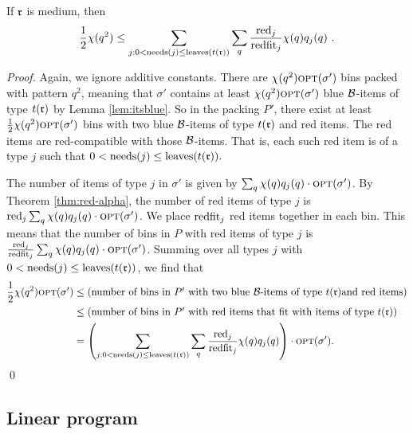 \begin{lemma}
	\label{lem:q2fv}
	If $\mathfrak{r}$ is medium, then
	\[ \frac1{2}\chi(q^2) \le 
	\sum_{j:0<\mathrm{needs}(j)\le \mathrm{leaves}({t(\mathfrak{r})})} \sum_{q} \frac{\mathrm{red}_j}{\mathrm{redfit}_j}\chi(q)q_j(q)\ .\] 
\end{lemma}
\begin{proof}
	Again, we ignore additive constants.
	There are $\chi(q^2)\mbox{\textsc{opt}}(\sigma')$ bins packed with pattern $q^2$, meaning that
 	$\sigma'$ contains at least $\chi(q^2)\mbox{\textsc{opt}}(\sigma')$ blue $\mathcal{B}$-items of type $t(\mathfrak{r})$
	by Lemma \ref{lem:itsblue}. So in the packing $P'$, there exist
	at least $\frac1{2}\chi(q^2)\mbox{\textsc{opt}}(\sigma')$ bins with two blue $\mathcal{B}$-items of type $t(\mathfrak{r})$
	and red items. The red items are red-compatible with those $\mathcal{B}$-items.
	That is, each such red item is of a type $j$ such that $0<\mathrm{needs}(j)\le \mathrm{leaves}(t(\mathfrak{r})).$
	
	The number of items of type $j$ in $\sigma'$ is given by
	$\sum_q \chi(q)q_j(q)\cdot\mbox{\textsc{opt}}(\sigma')$.
	By Theorem \ref{thm:red-alpha}, the number of red items of type $j$ is $\mathrm{red}_j\sum_q \chi(q)q_j(q)\cdot\mbox{\textsc{opt}}(\sigma')$.
We place $\mathrm{redfit}_j$ red items together in each bin.
	This means that the number of bins in $P$ with red items of type $j$
	is $\frac{\mathrm{red}_j}{\mathrm{redfit}_j}\sum_q \chi(q)q_j(q)\cdot\mbox{\textsc{opt}}(\sigma')$.
Summing over all types $j$ with $0<\mathrm{needs}(j)\le \mathrm{leaves}(t(\mathfrak{r}))$, we find that
	\begin{align*}
	\frac1{2}\chi(q^2)\mbox{\textsc{opt}}(\sigma')
	&\le 
	(\mbox{number of bins in $P'$ with two blue $\mathcal{B}$-items of type } t(\mathfrak{r}) \mbox{and red items})\\
	&\le
	(\mbox{number of bins in $P'$ with red items that fit with items} \mbox{ of type } t(\mathfrak{r}))\\
	&= \left(\sum_{j:0<\mathrm{needs}(j)\le \mathrm{leaves}(t(\mathfrak{r}))} 
	\sum_q \frac{\mathrm{red}_j}{\mathrm{redfit}_j}\chi(q)q_j(q)\right)\cdot\mbox{\textsc{opt}}(\sigma').
	\end{align*}
	\qed\end{proof}

\subsection{Linear program}


